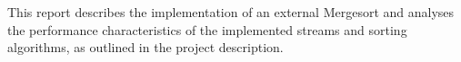 This report describes the implementation of an external Mergesort and analyses the performance characteristics of the implemented streams and sorting algorithms, as outlined in the project description.
